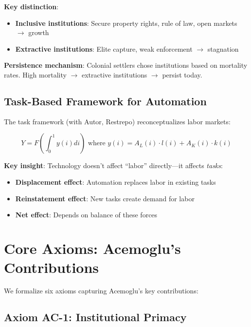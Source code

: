 \textbf{Key distinction}:
\begin{itemize}
    \item \textbf{Inclusive institutions}: Secure property rights, rule of law, open markets $\rightarrow$ growth
    \item \textbf{Extractive institutions}: Elite capture, weak enforcement $\rightarrow$ stagnation
\end{itemize}

\textbf{Persistence mechanism}: Colonial settlers chose institutions based on mortality rates. High mortality $\rightarrow$ extractive institutions $\rightarrow$ persist today.

\subsection{Task-Based Framework for Automation}

The task framework (with Autor, Restrepo) reconceptualizes labor markets:

\begin{equation}
Y = F\left(\int_0^1 y(i) di\right) \text{ where } y(i) = A_L(i) \cdot l(i) + A_K(i) \cdot k(i)
\end{equation}

\textbf{Key insight}: Technology doesn't affect ``labor'' directly---it affects \textit{tasks}:
\begin{itemize}
    \item \textbf{Displacement effect}: Automation replaces labor in existing tasks
    \item \textbf{Reinstatement effect}: New tasks create demand for labor
    \item \textbf{Net effect}: Depends on balance of these forces
\end{itemize}

\section{Core Axioms: Acemoglu's Contributions}

We formalize six axioms capturing Acemoglu's key contributions:

\subsection{Axiom AC-1: Institutional Primacy}

